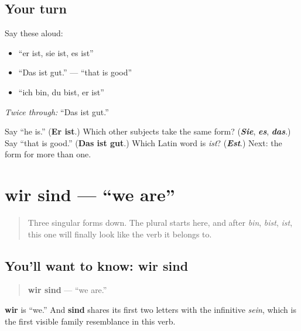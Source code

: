 \subsection*{Your turn}
Say these aloud:

\begin{itemize}
\raggedright
  \item \textquotedblleft{}er ist, sie ist, es ist\textquotedblright{}
  \item \textquotedblleft{}Das ist gut.\textquotedblright{} — \textquotedblleft{}that is good\textquotedblright{}
  \item \textquotedblleft{}ich bin, du bist, er ist\textquotedblright{}
\end{itemize}

\emph{Twice through:} \textquotedblleft{}Das ist gut.\textquotedblright{}

\begin{tcolorbox}[breakable,colback=teal!4,colframe=teal!35!black,title={Before you move on}]
Say \textquotedblleft{}he is.\textquotedblright{} (\textbf{Er ist}.) Which other subjects take the same form? (\emph{\textbf{Sie}}, \emph{\textbf{es}}, \emph{\textbf{das}}.) Say \textquotedblleft{}that is good.\textquotedblright{} (\textbf{Das ist gut}.) Which Latin word is \emph{ist}? (\emph{\textbf{Est}}.) Next: the form for more than one.
\end{tcolorbox}
\section[wir sind]{wir sind — \textquotedblleft{}we are\textquotedblright{}}

\label{lesson:GE-C16-wir-sind}



\begin{quote}
Three singular forms down. The plural starts here, and after \emph{bin}, \emph{bist}, \emph{ist}, this one will finally look like the verb it belongs to.
\end{quote}

\subsection*{You'll want to know: wir sind}
\begin{quote}
\textbf{wir sind} — \textquotedblleft{}we are.\textquotedblright{}
\end{quote}

\textbf{wir} is \textquotedblleft{}we.\textquotedblright{} And \textbf{sind} shares its first two letters with the infinitive \emph{sein}, which is the first visible family resemblance in this verb.

